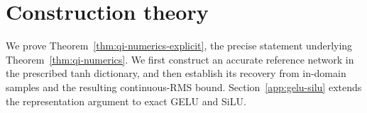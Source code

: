 \providecommand{\R}{\mathbb R}
\providecommand{\C}{\mathbb C}
\providecommand{\Om}{\Omega}
\providecommand{\eps}{\varepsilon}
\providecommand{\dist}{\operatorname{dist}}
\providecommand{\sech}{\operatorname{sech}}
\providecommand{\norm}[1]{\ensuremath{\left\lVert #1\right\rVert}}
\providecommand{\Erep}{E_{\mathrm{rep}}}
\providecommand{\Cbd}{C_{\mathrm{bd}}}
\providecommand{\Dlam}{D_\lambda}
\providecommand{\capp}{c_{\mathrm{app}}}
\providecommand{\QUILLMainTheorem}{Theorem~\ref{thm:qi-numerics}}
\providecommand{\QUILLMainCorollary}{Corollary~\ref{cor:qi-log-width}}
\providecommand{\qeqref}[1]{(\ref{#1})}

\appendix
{}
\section{Construction theory}
\label{app:construction-theory}

We prove Theorem~\ref{thm:qi-numerics-explicit}, the precise statement underlying
\QUILLMainTheorem. We first construct an accurate reference network in the
prescribed tanh dictionary, and then establish its recovery from in-domain
samples and the resulting continuous-RMS bound. Section~\ref{app:gelu-silu}
extends the representation argument to exact GELU and SiLU.

